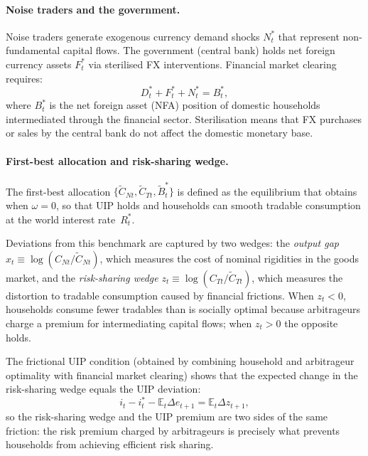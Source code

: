 \documentclass[12pt,a4paper]{article}
\begin{document}
\paragraph{Noise traders and the government.} Noise traders generate exogenous currency demand shocks $N^*_t$ that represent non-fundamental capital flows. The government (central bank) holds net foreign currency assets $F^*_t$ via sterilised FX interventions. Financial market clearing requires:
\begin{equation}
    D^*_t + F^*_t + N^*_t = B^*_t,
    \label{eq:fmclearing}
\end{equation}
where $B^*_t$ is the net foreign asset (NFA) position of domestic households intermediated through the financial sector. Sterilisation means that FX purchases or sales by the central bank do not affect the domestic monetary base.%

\paragraph{First-best allocation and risk-sharing wedge.} The first-best allocation $\{\tilde{C}_{Nt}, \tilde{C}_{Tt}, \tilde{B}^*_t\}$ is defined as the equilibrium that obtains when $\omega = 0$, so that UIP holds and households can smooth tradable consumption at the world interest rate~$R^*_t$. 

Deviations from this benchmark are captured by two wedges: the \textit{output gap} $x_t \equiv \log(C_{Nt}/\tilde{C}_{Nt})$, which measures the cost of nominal rigidities in the goods market, and the \textit{risk-sharing wedge} $z_t \equiv \log(C_{Tt}/\tilde{C}_{Tt})$, which measures the distortion to tradable consumption caused by financial frictions. When $z_t < 0$, households consume fewer tradables than is socially optimal because arbitrageurs charge a premium for intermediating capital flows; when $z_t > 0$ the opposite holds.

The frictional UIP condition (obtained by combining household and arbitrageur optimality with financial market clearing) shows that the expected change in the risk-sharing wedge equals the UIP deviation:
\begin{equation}
    i_t - i^*_t - \mathbb{E}_t \Delta e_{t+1} = \mathbb{E}_t \Delta z_{t+1},
    \label{eq:uip_wedge}
\end{equation}
so the risk-sharing wedge and the UIP premium are two sides of the same friction: the risk premium charged by arbitrageurs is precisely what prevents households from achieving efficient risk sharing.
\end{document}
